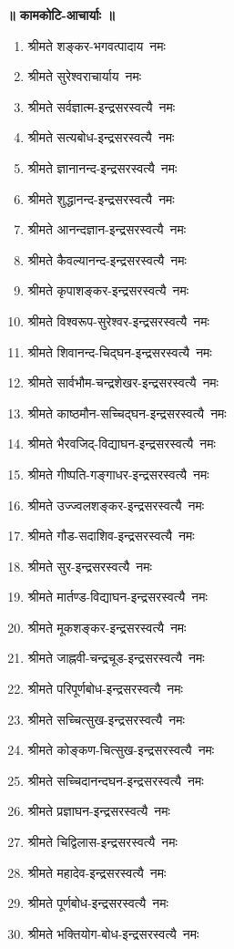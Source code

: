 \begin{center}
\begin{flushleft}
\centerline{\bfseries ॥ कामकोटि-आचार्याः ॥}
\begin{enumerate}
\item श्रीमते शङ्कर-भगवत्पादाय~नमः
\item श्रीमते सुरेश्वराचार्याय~नमः
\item श्रीमते सर्वज्ञात्म-इन्द्रसरस्वत्यै~नमः
\item श्रीमते सत्यबोध-इन्द्रसरस्वत्यै~नमः
\item श्रीमते ज्ञानानन्द-इन्द्रसरस्वत्यै~नमः
\item श्रीमते शुद्धानन्द-इन्द्रसरस्वत्यै~नमः
\item श्रीमते आनन्दज्ञान-इन्द्रसरस्वत्यै~नमः
\item श्रीमते कैवल्यानन्द-इन्द्रसरस्वत्यै~नमः
\item श्रीमते कृपाशङ्कर-इन्द्रसरस्वत्यै~नमः
\item श्रीमते विश्वरूप-सुरेश्वर-इन्द्रसरस्वत्यै~नमः
\item श्रीमते शिवानन्द-चिद्घन-इन्द्रसरस्वत्यै~नमः
\item श्रीमते सार्वभौम-चन्द्रशेखर-इन्द्रसरस्वत्यै~नमः
\item श्रीमते काष्ठमौन-सच्चिद्घन-इन्द्रसरस्वत्यै~नमः
\item श्रीमते भैरवजिद्-विद्याघन-इन्द्रसरस्वत्यै~नमः
\item श्रीमते गीष्पति-गङ्गाधर-इन्द्रसरस्वत्यै~नमः
\item श्रीमते उज्ज्वलशङ्कर-इन्द्रसरस्वत्यै~नमः
\item श्रीमते गौड-सदाशिव-इन्द्रसरस्वत्यै~नमः
\item श्रीमते सुर-इन्द्रसरस्वत्यै~नमः
\item श्रीमते मार्तण्ड-विद्याघन-इन्द्रसरस्वत्यै~नमः
\item श्रीमते मूकशङ्कर-इन्द्रसरस्वत्यै~नमः
\item श्रीमते जाह्नवी-चन्द्रचूड-इन्द्रसरस्वत्यै~नमः
\item श्रीमते परिपूर्णबोध-इन्द्रसरस्वत्यै~नमः
\item श्रीमते सच्चित्सुख-इन्द्रसरस्वत्यै~नमः
\item श्रीमते कोङ्कण-चित्सुख-इन्द्रसरस्वत्यै~नमः
\item श्रीमते सच्चिदानन्दघन-इन्द्रसरस्वत्यै~नमः
\item श्रीमते प्रज्ञाघन-इन्द्रसरस्वत्यै~नमः
\item श्रीमते चिद्विलास-इन्द्रसरस्वत्यै~नमः
\item श्रीमते महादेव-इन्द्रसरस्वत्यै~नमः
\item श्रीमते पूर्णबोध-इन्द्रसरस्वत्यै~नमः
\item श्रीमते भक्तियोग-बोध-इन्द्रसरस्वत्यै~नमः

\end{enumerate}
\end{flushleft}
\end{center}
